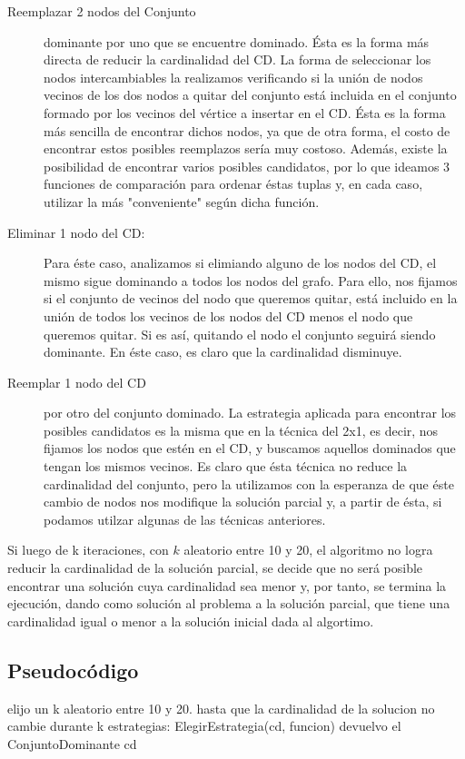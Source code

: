 \begin{description}
\item[Reemplazar 2 nodos del Conjunto] dominante por uno que se encuentre dominado. Ésta es la forma más directa de reducir la cardinalidad del CD. La forma de seleccionar los nodos intercambiables la realizamos verificando si la unión de nodos vecinos de los dos nodos a quitar del conjunto está incluida en el conjunto formado por los vecinos del vértice a insertar en el CD. Ésta es la forma más sencilla de encontrar dichos nodos, ya que de otra forma, el costo de encontrar estos posibles reemplazos sería muy costoso. Además, existe la posibilidad de encontrar varios posibles candidatos, por lo que ideamos 3 funciones de comparación para ordenar éstas tuplas y, en cada caso, utilizar la más "conveniente" según dicha función.
\item[Eliminar 1 nodo del CD:] Para éste caso, analizamos si elimiando alguno de los nodos del CD, el mismo sigue dominando a todos los nodos del grafo. Para ello, nos fijamos si el conjunto de vecinos del nodo que queremos quitar, está incluido en la unión de todos los vecinos de los nodos del CD menos el nodo que queremos quitar. Si es así, quitando el nodo el conjunto seguirá siendo dominante. En éste caso, es claro que la cardinalidad disminuye.
\item[Reemplar 1 nodo del CD] por otro del conjunto dominado. La estrategia aplicada para encontrar los posibles candidatos es la misma que en la técnica del 2x1, es decir, nos fijamos los nodos que estén en el CD, y buscamos aquellos dominados que tengan los mismos vecinos. Es claro que ésta técnica no reduce la cardinalidad del conjunto, pero la utilizamos con la esperanza de que éste cambio de nodos nos modifique la solución parcial y, a partir de ésta, si podamos utilzar algunas de las técnicas anteriores.
\end{description}

Si luego de k iteraciones, con $k$ aleatorio entre 10 y 20, el algoritmo no logra reducir la cardinalidad de la solución parcial, se decide que no será posible encontrar una solución cuya cardinalidad sea menor y, por tanto, se termina la ejecución, dando como solución al problema a la solución parcial, que tiene una cardinalidad igual o menor a la solución inicial dada al algortimo.

\subsection{Pseudocódigo}
\begin{codebox}
\li	elijo un k aleatorio entre 10 y 20.
\li	hasta que la cardinalidad de la solucion no cambie durante k estrategias: \Do
\li		ElegirEstrategia(cd, funcion)
\End
\End
\li	devuelvo el ConjuntoDominante cd
\end{codebox}


